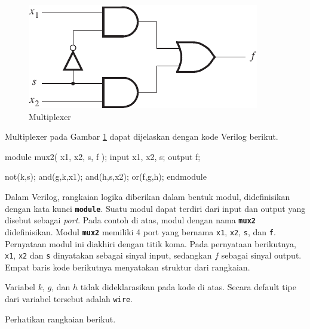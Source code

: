 \documentclass[a4paper,11pt,bahasa]{extarticle}
\begin{document}
\begin{figure}[h]
\centering
\includegraphics[scale=1.0]{images/fig_2_36.pdf}
\par
\caption{Multiplexer}\label{fig:mux2}
\end{figure}

 Multiplexer pada
Gambar \ref{fig:mux2} dapat dijelaskan dengan kode Verilog berikut.

{
\begin{verilogcode}
module mux2( x1, x2, s, f );
  input x1, x2, s;
  output f;

  not(k,s);
  and(g,k,x1);
  and(h,s,x2);
  or(f,g,h);
endmodule
\end{verilogcode}
}

Dalam Verilog, rangkaian logika diberikan dalam bentuk modul, didefinisikan
dengan
kata kunci {\tt \textbf{module}}. Suatu modul dapat terdiri dari input dan
output yang disebut sebagai \textit{port}.
Pada contoh di atas, modul dengan nama {\tt \textbf{mux2}} didefinisikan.
Modul {\tt \textbf{mux2}} memiliki 4 port yang bernama {\tt x1}, {\tt x2},
{\tt s}, dan {\tt f}. Pernyataan modul ini diakhiri dengan titik koma.
Pada pernyataan berikutnya, {\tt x1}, {\tt x2} dan {\tt s} dinyatakan
sebagai sinyal input, sedangkan $f$ sebagai sinyal output. Empat baris kode
berikutnya menyatakan struktur dari rangkaian.

Variabel $k$, $g$, dan $h$ tidak dideklarasikan pada kode di atas. Secara default
tipe dari variabel tersebut adalah {\tt wire}.

 Perhatikan rangkaian berikut.
\end{document}
